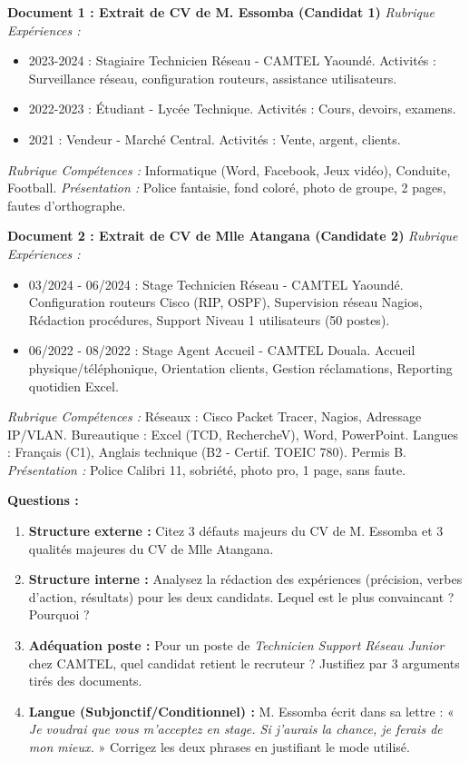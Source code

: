 \documentclass[11pt]{article}
\begin{document}
\begin{exercice}
\textbf{Document 1 : Extrait de CV de M. Essomba (Candidat 1)}
\textit{Rubrique Expériences :}
\begin{itemize}
\item 2023-2024 : Stagiaire Technicien Réseau - CAMTEL Yaoundé. Activités : Surveillance réseau, configuration routeurs, assistance utilisateurs.
\item 2022-2023 : Étudiant - Lycée Technique. Activités : Cours, devoirs, examens.
\item 2021 : Vendeur - Marché Central. Activités : Vente, argent, clients.
\end{itemize}
\textit{Rubrique Compétences :} Informatique (Word, Facebook, Jeux vidéo), Conduite, Football.
\textit{Présentation :} Police fantaisie, fond coloré, photo de groupe, 2 pages, fautes d'orthographe.

\textbf{Document 2 : Extrait de CV de Mlle Atangana (Candidate 2)}
\textit{Rubrique Expériences :}
\begin{itemize}
\item 03/2024 - 06/2024 : Stage Technicien Réseau - CAMTEL Yaoundé. Configuration routeurs Cisco (RIP, OSPF), Supervision réseau Nagios, Rédaction procédures, Support Niveau 1 utilisateurs (50 postes).
\item 06/2022 - 08/2022 : Stage Agent Accueil - CAMTEL Douala. Accueil physique/téléphonique, Orientation clients, Gestion réclamations, Reporting quotidien Excel.
\end{itemize}
\textit{Rubrique Compétences :} Réseaux : Cisco Packet Tracer, Nagios, Adressage IP/VLAN. Bureautique : Excel (TCD, RechercheV), Word, PowerPoint. Langues : Français (C1), Anglais technique (B2 - Certif. TOEIC 780). Permis B.
\textit{Présentation :} Police Calibri 11, sobriété, photo pro, 1 page, sans faute.

\textbf{Questions :}
\begin{enumerate}
\item \textbf{Structure externe :} Citez 3 défauts majeurs du CV de M. Essomba et 3 qualités majeures du CV de Mlle Atangana.
\item \textbf{Structure interne :} Analysez la rédaction des expériences (précision, verbes d'action, résultats) pour les deux candidats. Lequel est le plus convaincant ? Pourquoi ?
\item \textbf{Adéquation poste :} Pour un poste de \emph{Technicien Support Réseau Junior} chez CAMTEL, quel candidat retient le recruteur ? Justifiez par 3 arguments tirés des documents.
\item \textbf{Langue (Subjonctif/Conditionnel) :} M. Essomba écrit dans sa lettre : « \textit{Je voudrai que vous m'acceptez en stage. Si j'aurais la chance, je ferais de mon mieux.} » Corrigez les deux phrases en justifiant le mode utilisé.
\end{enumerate}
\end{exercice}
\end{document}

